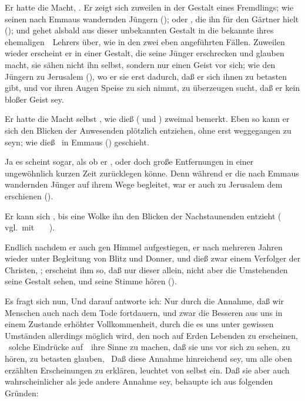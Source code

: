 \begin{aufza}
\begin{aufzb}
\begin{aufzc}
\item Er hatte die Macht, . Er zeigt sich zuweilen in der Gestalt eines Fremdlings; wie seinen nach Emmaus wandernden Jüngern (); oder , die ihn für den Gärtner hielt (); und gehet alsbald aus dieser unbekannten Gestalt in die bekannte ihres ehemaligen~\ Lehrers über, wie in den zwei eben angeführten Fällen. Zuweilen wieder erscheint er in einer Gestalt, die seine Jünger erschrecken und glauben macht, sie sähen nicht ihn selbst, sondern nur einen Geist vor sich; wie den Jüngern zu Jerusalem (), wo er sie erst dadurch, daß er sich ihnen zu betasten gibt, und vor ihren Augen Speise zu sich nimmt, zu überzeugen sucht, daß er kein bloßer Geist sey.
\item Er hatte die Macht selbst , wie dieß  ( und ) zweimal bemerkt. Eben so kann er sich den Blicken der Anwesenden plötzlich entziehen, ohne erst weggegangen zu seyn; wie dieß \zB\ in Emmaus () geschieht.
\item Ja es scheint sogar, als ob er , oder doch große Entfernungen in einer ungewöhnlich kurzen Zeit zurücklegen könne. Denn während er die nach Emmaus wandernden Jünger auf ihrem Wege begleitet, war er auch zu Jerusalem dem  erschienen ().
\item Er kann sich , bis eine Wolke ihn den Blicken der Nachstaunenden entzieht ( vgl.\ mit \ \ \ \uma ).
\item Endlich nachdem er auch gen Himmel aufgestiegen,  er nach mehreren Jahren wieder unter Begleitung von Blitz und Donner, und dieß zwar einem Verfolger der Christen, ; erscheint ihm so, daß nur dieser allein, nicht aber die Umstehenden seine Gestalt sehen, und seine Stimme hören ().
\end{aufzc}
\end{aufzb}
\item Es fragt sich nun,  Und darauf antworte ich: Nur durch die Annahme, daß wir Menschen auch nach dem Tode fortdauern, und zwar die Besseren aus uns in einem Zustande erhöhter Vollkommenheit, durch die es uns unter gewissen Umständen allerdings möglich wird, den noch auf Erden Lebenden zu erscheinen, \dh\ solche Eindrücke auf~\ ihre Sinne zu machen, daß sie uns vor sich zu sehen, zu hören, zu betasten glauben, \usw\ Daß diese Annahme hinreichend sey, um alle oben erzählten Erscheinungen  zu erklären, leuchtet von selbst ein. Daß sie aber auch wahrscheinlicher als jede andere Annahme sey, behaupte ich aus folgenden Gründen:

\end{aufza}
